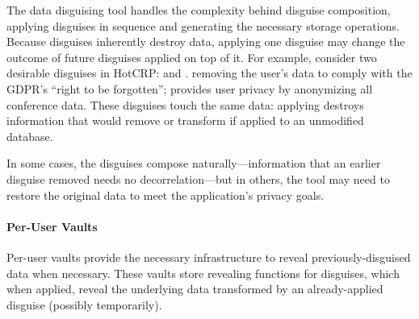 The data disguising tool handles the complexity behind disguise composition, applying disguises in
sequence and generating the necessary storage operations.
%
%
Because disguises inherently destroy data, applying one disguise may change the outcome of future
disguises applied on top of it.
%
%
For example, consider two desirable disguises in HotCRP: \gdpr and \ca.
%
\gdpr removing the user's data to comply with the GDPR's ``right to be forgotten''; \ca provides
user privacy by anonymizing all conference data.
%
These disguises touch the same data: applying \ca destroys information that \gdpr would remove
or transform if applied to an unmodified database.
%

%
In some cases, the disguises compose naturally---\eg information that an earlier disguise removed
needs no decorrelation---but in others, the tool may need to restore the original data to meet the
application's privacy goals.
%



\paragraph{Per-User Vaults}

Per-user vaults provide the necessary infrastructure to reveal previously-disguised data when
necessary.
%
These vaults store revealing functions for disguises, which when applied, reveal the underlying
data transformed by an already-applied disguise (possibly temporarily).
%

